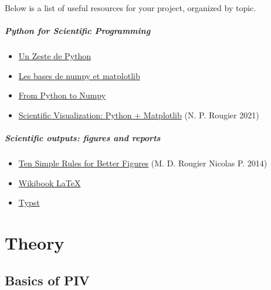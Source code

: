 \documentclass[
  english,
  letterpaper,
  numbers=noendperiod,
  DIV=13]{scrreprt}
\providecommand{\tightlist}{%
  \setlength{\itemsep}{0pt}\setlength{\parskip}{0pt}}
\begin{document}

Below is a list of useful resources for your project, organized by
topic.

\subsubsection*{Python for Scientific
Programming}\label{python-for-scientific-programming}

\begin{itemize}
\tightlist
\item
  \href{https://zestedesavoir.com/tutoriels/2514/un-zeste-de-python/}{Un
  Zeste de Python}
\item
  \href{https://zestedesavoir.com/tutoriels/4139/les-bases-de-numpy-et-matplotlib/}{Les
  bases de numpy et matplotlib}
\item
  \href{https://www.labri.fr/perso/nrougier/from-python-to-numpy/}{From
  Python to Numpy}
\item
  \href{https://inria.hal.science/hal-03427242v1/file/scientific-visualization-python-matplotlib.pdf}{Scientific
  Visualization: Python + Matplotlib} (N. P. Rougier 2021)
\end{itemize}

\subsubsection*{Scientific outputs: figures and
reports}\label{scientific-outputs-figures-and-reports}

\begin{itemize}
\tightlist
\item
  \href{https://journals.plos.org/ploscompbiol/article/file?id=10.1371/journal.pcbi.1003833&type=printable}{Ten
  Simple Rules for Better Figures} (M. D. Rougier Nicolas P. 2014)
\item
  \href{https://fr.wikibooks.org/wiki/LaTeX}{Wikibook LaTeX}
\item
  \href{https://typst.app/}{Typst}
\end{itemize}

\part{Theory}

\chapter{Basics of PIV}\label{basics-of-piv}
\end{document}
